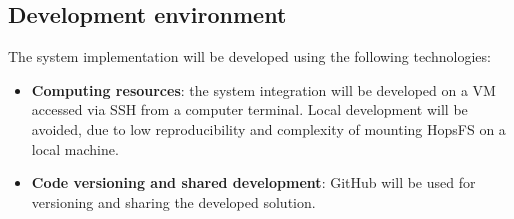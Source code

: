 \subsection{Development environment}
The system implementation will be developed using the following technologies:
\begin{itemize}
    \item \textbf{Computing resources}: the system integration will be developed on a \gls{VM} accessed via \gls{SSH} from a computer terminal. Local development will be avoided, due to low reproducibility and complexity of mounting \gls{HopsFS} on a local machine.
    \item \textbf{Code versioning and shared development}: GitHub will be used for versioning and sharing the developed solution.
\end{itemize}
